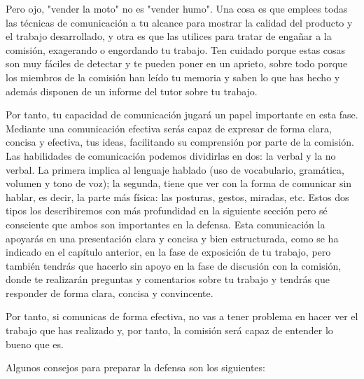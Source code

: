 Pero ojo, "vender la moto" no es "vender humo". Una cosa es que emplees todas las técnicas de comunicación a tu alcance para mostrar la calidad del producto y el trabajo desarrollado, y otra es que las utilices para tratar de engañar a la comisión, exagerando o engordando tu trabajo. Ten cuidado porque estas cosas son muy fáciles de detectar y te pueden poner en un aprieto, sobre todo porque los miembros de la comisión han leído tu memoria y saben lo que has hecho y además disponen de un informe del tutor sobre tu trabajo.

Por tanto, tu capacidad de comunicación jugará un papel importante en esta fase. Mediante una comunicación efectiva serás capaz de expresar de forma clara, concisa y efectiva, tus ideas, facilitando su comprensión por parte de la comisión. Las habilidades de comunicación podemos dividirlas en dos: la verbal y la no verbal. La primera implica al lenguaje hablado (uso de vocabulario, gramática, volumen y tono de voz); la segunda, tiene que ver con la forma de comunicar sin hablar, es decir, la parte más física: las posturas, gestos, miradas, etc. Estos dos tipos los describiremos con más profundidad en la siguiente sección pero sé consciente que ambos son importantes en la defensa. Esta comunicación la apoyarás en una presentación clara y concisa y bien estructurada, como se ha indicado en el capítulo anterior, en la fase de exposición de tu trabajo, pero también tendrás que hacerlo sin apoyo en la fase de discusión con la comisión, donde te realizarán preguntas y comentarios sobre tu trabajo y tendrás que responder de forma clara, concisa y convincente.

Por tanto, si comunicas de forma efectiva, no vas a tener problema en hacer ver el trabajo que has realizado y, por tanto, la comisión será capaz de entender lo bueno que es. 

Algunos consejos para preparar la defensa son los siguientes:

